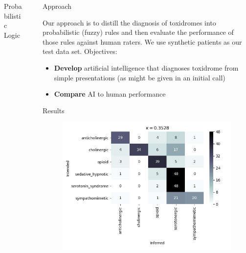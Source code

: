 \documentclass[final]{beamer}
\newlength{\sepwidth}
\newlength{\colwidth}
\newcommand{\separatorcolumn}{\begin{column}{\sepwidth}\end{column}}
\begin{document}
\begin{frame}[t]
\begin{columns}[t]
\begin{column}{\colwidth}
\begin{alertblock}{Probabilistic Logic}
  \end{alertblock}

\end{column}

\separatorcolumn

\begin{column}{\colwidth}

  \begin{block}{Approach}

    Our approach is to distill the diagnosis of toxidromes into probabilistic (fuzzy) rules and then evaluate the performance of those rules against human raters. We use synthetic patients as our test data set. Objectives:


    \begin{itemize}
      \item \textbf{Develop} artificial intelligence that diagnoses toxidrome from simple presentations (as might be given in an initial call)
      \item \textbf{Compare} AI to human performance
    \end{itemize}
  \end{block}

  \begin{block}{Results}

    
     \begin{figure}
     \begin{minipage}{0.6\colwidth}
         \includegraphics{./inferred-intended-overall.png}
 \end{minipage}\begin{minipage}{0.35\colwidth}
  

\end{minipage}
\end{figure}
\end{block}
\end{column}
\end{columns}
\end{frame}
\end{document}
